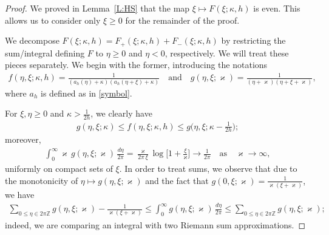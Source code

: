 \documentclass{amsart}
\newcommand{\Z}{{\mathbb{Z}}}
\newcommand{\qtq}[1]{\quad\text{#1}\quad}
\newcommand{\vk}{\varkappa}
\theoremstyle{definition}
\theoremstyle{remark}
\begin{document}
\begin{proof}
We proved in Lemma~\ref{L:HS} that the map \(\xi\mapsto F(\xi;\kappa,h)\) is even.  This allows us to consider only $\xi\geq 0$ for the remainder of the proof.  

We decompose $F(\xi;\kappa,h)=F_+(\xi;\kappa,h)+F_-(\xi;\kappa,h)$ by restricting the sum/integral defining $F$ to $\eta\geq0$ and $\eta<0$, respectively.  We will treat these pieces separately.  We begin with the former, introducing the notations
\begin{align*}
f(\eta,\xi;\kappa,h) = \tfrac1{(a_h(\eta) + \kappa) ( a_h(\eta+\xi) + \kappa )}
	\qtq{and} g(\eta,\xi;\vk) = \tfrac1{(\eta  + \vk)( \eta + \xi + \vk)},
\end{align*}
where \(a_h\) is defined as in \eqref{symbol}.

For $\xi,\eta\geq 0$ and \(\kappa>\frac1{2h}\), we clearly have
\begin{align}\label{10:50}
g(\eta,\xi;\kappa) \leq f(\eta,\xi;\kappa,h) \leq g\bigl(\eta,\xi;\kappa-\tfrac1{2h}\bigr);
\end{align}
moreover,
\begin{align}\label{10:51}
\int_0^\infty \vk \, g(\eta,\xi;\vk) \,\tfrac{d\eta}{2\pi} =  \tfrac\vk{2\pi\,\xi} \log\bigl[ 1 + \tfrac{\xi}{\vk} \bigr]  \longrightarrow \tfrac1{2\pi} \quad \text{as}\quad \vk\to\infty,
\end{align}
uniformly on compact sets of $\xi$.  In order to treat sums, we observe that due to the monotonicity of $\eta\mapsto g(\eta,\xi;\vk)$ and the fact that \(g(0,\xi;\vk) = \frac1{\vk(\xi+\vk)}\), we have
\begin{align}\label{10:52}
 \sum_{0\leq\eta\in2\pi\Z} g(\eta,\xi;\vk) - \tfrac1{\vk(\xi+\vk)}   \leq \int_0^\infty g(\eta,\xi;\vk) \,\tfrac{d\eta}{2\pi} \leq \sum_{0\leq\eta\in2\pi\Z} g(\eta,\xi;\vk);
\end{align}
indeed, we are comparing an integral with two Riemann sum approximations.


\end{proof}
\end{document}
